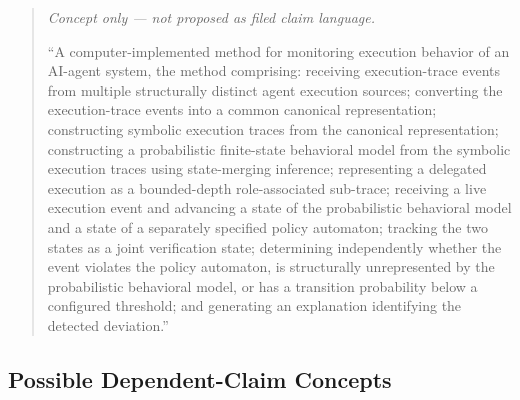 \documentclass[11pt,a4paper]{article}
\begin{document}
\begin{quote}
\small\itshape
\noindent
Concept only --- not proposed as filed claim language.

``A computer-implemented method for monitoring execution behavior of an AI-agent system,
the method comprising: receiving execution-trace events from multiple structurally
distinct agent execution sources; converting the execution-trace events into a common
canonical representation; constructing symbolic execution traces from the canonical
representation; constructing a probabilistic finite-state behavioral model from the
symbolic execution traces using state-merging inference; representing a delegated
execution as a bounded-depth role-associated sub-trace; receiving a live execution event
and advancing a state of the probabilistic behavioral model and a state of a separately
specified policy automaton; tracking the two states as a joint verification state;
determining independently whether the event violates the policy automaton, is
structurally unrepresented by the probabilistic behavioral model, or has a transition
probability below a configured threshold; and generating an explanation identifying the
detected deviation.''
\end{quote}

\subsection{Possible Dependent-Claim Concepts}
\end{document}
